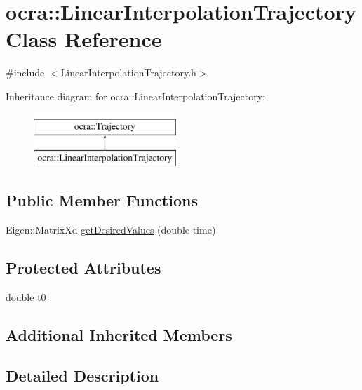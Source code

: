 \hypertarget{classocra_1_1LinearInterpolationTrajectory}{}\section{ocra\+:\+:Linear\+Interpolation\+Trajectory Class Reference}
\label{classocra_1_1LinearInterpolationTrajectory}


{\ttfamily \#include $<$Linear\+Interpolation\+Trajectory.\+h$>$}

Inheritance diagram for ocra\+:\+:Linear\+Interpolation\+Trajectory\+:\begin{figure}[H]
\begin{center}
\leavevmode
\includegraphics[height=2.000000cm]{d9/dfa/classocra_1_1LinearInterpolationTrajectory}
\end{center}
\end{figure}
\subsection*{Public Member Functions}
\begin{DoxyCompactItemize}
\item 
Eigen\+::\+Matrix\+Xd \hyperlink{classocra_1_1LinearInterpolationTrajectory_a342ca41e9c55e46cc40f884b9f7a6412}{get\+Desired\+Values} (double time)
\end{DoxyCompactItemize}
\subsection*{Protected Attributes}
\begin{DoxyCompactItemize}
\item 
double \hyperlink{classocra_1_1LinearInterpolationTrajectory_af29697e472859fbf1cbbf4ad30068222}{t0}
\end{DoxyCompactItemize}
\subsection*{Additional Inherited Members}


\subsection{Detailed Description}



